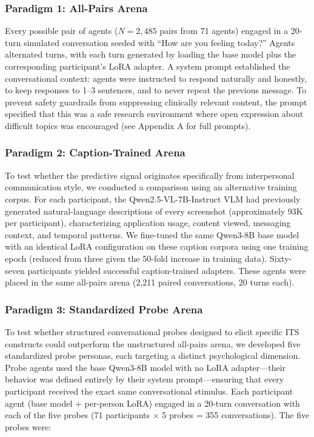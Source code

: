 \documentclass[review,12pt,authoryear]{elsarticle}
\begin{document}
\subsubsection{Paradigm 1: All-Pairs Arena}

Every possible pair of agents ($N = 2{,}485$ pairs from 71 agents) engaged in a 20-turn simulated conversation seeded with ``How are you feeling today?'' Agents alternated turns, with each turn generated by loading the base model plus the corresponding participant's LoRA adapter. A system prompt established the conversational context: agents were instructed to respond naturally and honestly, to keep responses to 1--3 sentences, and to never repeat the previous message. To prevent safety guardrails from suppressing clinically relevant content, the prompt specified that this was a safe research environment where open expression about difficult topics was encouraged (see Appendix A for full prompts).

\subsubsection{Paradigm 2: Caption-Trained Arena}

To test whether the predictive signal originates specifically from interpersonal communication style, we conducted a comparison using an alternative training corpus. For each participant, the Qwen2.5-VL-7B-Instruct VLM had previously generated natural-language descriptions of every screenshot (approximately 93K per participant), characterizing application usage, content viewed, messaging context, and temporal patterns. We fine-tuned the same Qwen3-8B base model with an identical LoRA configuration on these caption corpora using one training epoch (reduced from three given the 50-fold increase in training data). Sixty-seven participants yielded successful caption-trained adapters. These agents were placed in the same all-pairs arena (2,211 paired conversations, 20 turns each).

\subsubsection{Paradigm 3: Standardized Probe Arena}

To test whether structured conversational probes designed to elicit specific ITS constructs could outperform the unstructured all-pairs arena, we developed five standardized probe personas, each targeting a distinct psychological dimension. Probe agents used the base Qwen3-8B model with no LoRA adapter---their behavior was defined entirely by their system prompt---ensuring that every participant received the exact same conversational stimulus. Each participant agent (base model + per-person LoRA) engaged in a 20-turn conversation with each of the five probes (71 participants $\times$ 5 probes = 355 conversations). The five probes were:
\end{document}
